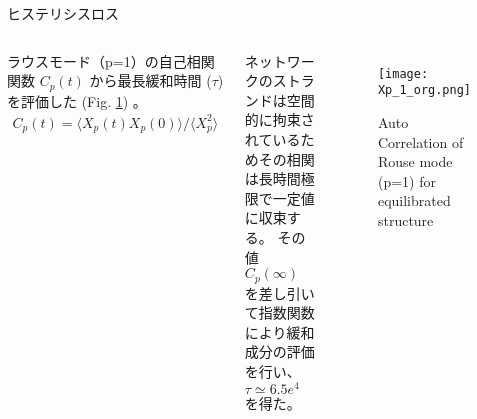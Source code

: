 \begin{columns}[totalwidth=.85\linewidth]
		\begin{itembox}[l]{ヒステリシスロス}
			\begin{columns}[totalwidth=\linewidth]
				ラウスモード（p=1）の自己相関関数 $C_p(t)$ から最長緩和時間 ($\tau$) を評価した (Fig. \ref{ac-xp}) 。
				\begin{align*}
					C_p(t) = \langle X_p(t)X_p(0) \rangle/\langle X_p^2 \rangle
				\end{align*}
				
				ネットワークのストランドは空間的に拘束されているためその相関は長時間極限で一定値に収束する。
				その値 $C_p(\infty)$ を差し引いて指数関数により緩和成分の評価を行い、$\tau \simeq 6.5e^{4}$ を得た。
				
				\begin{figure}[htb]
					\centering
						\texttt{[image: Xp\_1\_org.png]}
						\caption{Auto Correlation of Rouse mode (p=1) for equilibrated structure}
						\label{ac-xp}
				\end{figure}
				\end{columns}
		\end{itembox}

\end{columns}